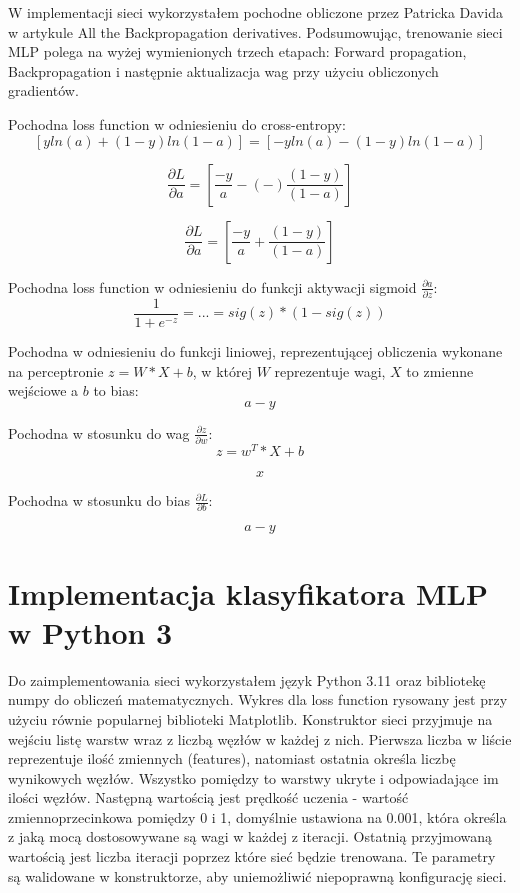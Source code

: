\documentclass[12pt]{article}
\begin{document}
W implementacji sieci wykorzystałem pochodne obliczone przez Patricka Davida w artykule All the Backpropagation derivatives. Podsumowując, trenowanie sieci MLP polega na wyżej wymienionych trzech etapach: Forward propagation, Backpropagation i następnie aktualizacja wag przy użyciu obliczonych gradientów.

Pochodna loss function w odniesieniu do cross-entropy:
$$[yln(a) + (1-y)ln(1-a)] = [-yln(a) - (1-y)ln(1-a)]$$

$$\frac{\partial L}{\partial a} = [\frac{-y}{a} - (-)\frac{(1-y)}{(1-a)}]$$

$$\frac{\partial L}{\partial a} = [\frac{-y}{a} + \frac{(1-y)}{(1-a)}]$$

Pochodna loss function w odniesieniu do funkcji aktywacji sigmoid $\frac{\partial a}{\partial z}$:
$$\frac{1}{1+e^{-z}} = ... = sig(z) * (1 - sig (z))$$

Pochodna w odniesieniu do funkcji liniowej, reprezentującej obliczenia wykonane na perceptronie $z = W*X + b$, w której $W$ reprezentuje wagi, $X$ to zmienne wejściowe a $b$ to bias:
$$a - y$$

Pochodna w stosunku do wag $\frac{\partial z}{\partial w}$:
$$z = w^T*X + b$$

$$x$$

Pochodna w stosunku do bias $\frac{\partial L}{\partial b}$:

$$a - y$$

\section{Implementacja klasyfikatora MLP w Python 3}

Do zaimplementowania sieci wykorzystałem język Python 3.11 oraz bibliotekę numpy do obliczeń matematycznych. Wykres dla loss function rysowany jest przy użyciu równie popularnej biblioteki Matplotlib.
Konstruktor sieci przyjmuje na wejściu listę warstw wraz z liczbą węzłów w każdej z nich. Pierwsza liczba w liście reprezentuje ilość zmiennych (features), natomiast ostatnia określa liczbę wynikowych węzłów. Wszystko pomiędzy to warstwy ukryte i odpowiadające im ilości węzłów. Następną wartością jest prędkość uczenia - wartość zmiennoprzecinkowa pomiędzy 0 i 1, domyślnie ustawiona na 0.001, która określa z jaką mocą dostosowywane są wagi w każdej z iteracji. Ostatnią przyjmowaną wartością jest liczba iteracji poprzez które sieć będzie trenowana. Te parametry są walidowane w konstruktorze, aby uniemożliwić niepoprawną konfigurację sieci.
\end{document}

